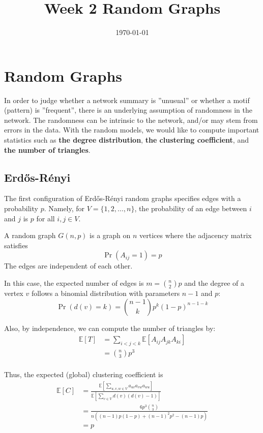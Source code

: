 \documentclass{article}
\title{Week 2 Random Graphs}
\date{\today}
\begin{document}
\maketitle

\section{Random Graphs}
In order to judge whether a network summary is ”unusual” or whether a motif (pattern) is ”frequent”, there is an underlying assumption of randomness in the network. The randomness can be intrinsic to the network, and/or may stem from errors in the data. With the random models, we would like to compute important statistics such as \textbf{the degree distribution}, \textbf{the clustering coefficient}, and \textbf{the number of triangles}.

\subsection{Erd\H{o}s-R\'{e}nyi}
The first configuration of Erd\H{o}s-R\'{e}nyi random graphs specifies edges with a probability $p$. Namely, for $V=\{1,2,\ldots,n\}$, the probability of an edge between $i$ and $j$ is $p$ for all $i,j\in V$.
\begin{definition}
    A random graph $G(n,p)$ is a graph on $n$ vertices where the adjacency matrix satisfies
    \begin{equation*}
        \Pr(A_{ij}=1)=p
    \end{equation*}
    The edges are independent of each other.
\end{definition}

In this case, the expected number of edges is $m=\binom{n}{2}p$ and the degree of a vertex $v$ follows a binomial distribution with parameters $n-1$ and $p$:
$$
\Pr(d(v)=k)=\binom{n-1}{k}p^k(1-p)^{n-1-k}
$$

Also, by independence, we can compute the number of triangles by:
\begin{align*}
    \mathbb{E}[T]&=\sum_{i<j<k} \mathbb{E}[A_{ij}A_{jk}A_{ki}]\\
    &=\binom{n}{3}p^3\\
\end{align*}

Thus, the expected (global) clustering coefficient is
\begin{align*}
    \mathbb{E}[C]&=\frac{\mathbb{E}[\sum_{u,v,w \in V} a_{uv}a_{vw}a_{wu}]}{\mathbb{E}[\sum_{v\in V} d(v)(d(v)-1)]} \\
    &= \frac{6p^3 \binom{n}{3}}{n ((n-1)p(1-p) + (n-1)^2p^2 -(n-1)p)}\\
    &=p
\end{align*}
\end{document}
